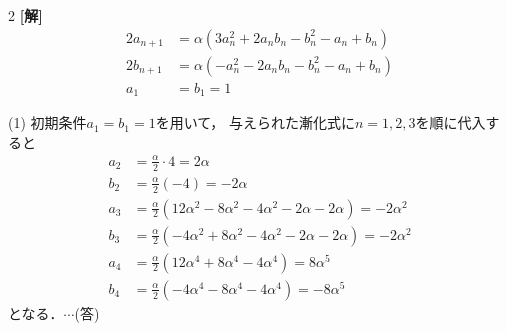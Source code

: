 \documentclass[../../../../main.tex]{subfiles}
\begin{document}
\setcounter{equation}{0}
\begin{oframed}
    
\end{oframed}
\setlength{\columnseprule}{0.4pt}
\begin{multicols}{2}
    {\bf[解]}
    \begin{align*}
        2a_{n+1} & = \alpha (3a_n^2 + 2a_n b_n - b_n^2 - a_n + b_n) \\
        2b_{n+1} & = \alpha (-a_n^2 - 2a_n b_n - b_n^2 - a_n + b_n) \\
        a_1      & = b_1 = 1
    \end{align*}

    (1)
    初期条件$a_1=b_1=1$を用いて，
    与えられた漸化式に$n=1,2,3$を順に代入すると
    \begin{align*}
        a_2 & = \frac{\alpha}{2} \cdot 4 = 2\alpha                                                     \\
        b_2 & = \frac{\alpha}{2} (-4) = -2\alpha                                                       \\
        a_3 & = \frac{\alpha}{2} (12\alpha^2 - 8\alpha^2 - 4\alpha^2 - 2\alpha - 2\alpha) = -2\alpha^2 \\
        b_3 & = \frac{\alpha}{2} (-4\alpha^2 + 8\alpha^2 - 4\alpha^2 - 2\alpha - 2\alpha) = -2\alpha^2 \\
        a_4 & = \frac{\alpha}{2} (12\alpha^4 + 8\alpha^4 - 4\alpha^4) = 8\alpha^5                      \\
        b_4 & = \frac{\alpha}{2} (-4\alpha^4 - 8\alpha^4 - 4\alpha^4) = -8\alpha^5
    \end{align*}
    となる．$\cdots$(答)
    \vspace{10pt}


\end{multicols}
\end{document}
